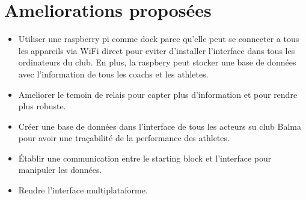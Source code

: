 \documentclass[12pt]{article}
\begin{document}
\section{Ameliorations propos\'ees}
\begin{itemize}
	\item Utiliser une raspberry pi comme dock parce
	qu'elle peut se connecter a tous les appareils via
	WiFi direct pour eviter d'installer l'interface 
	dans tous les ordinateurs du club. En plus, la
	raspbery peut stocker une base de donn\'ees avec
	l'information de tous les coachs et les athletes.


	\item Ameliorer le temoin de relais pour capter plus d'information
	et pour rendre plus robuste.
	\item Créer une base de donn\'ees dans l'interface de tous les acteurs
	su club Balma pour avoir une tra\c cabilit\'e de la
	performance des athletes. 
	\item Établir une communication entre le starting
	block et l'interface pour manipuler les donn\'ees.
	\item Rendre l'interface multiplataforme.


\end{itemize}
\end{document}
